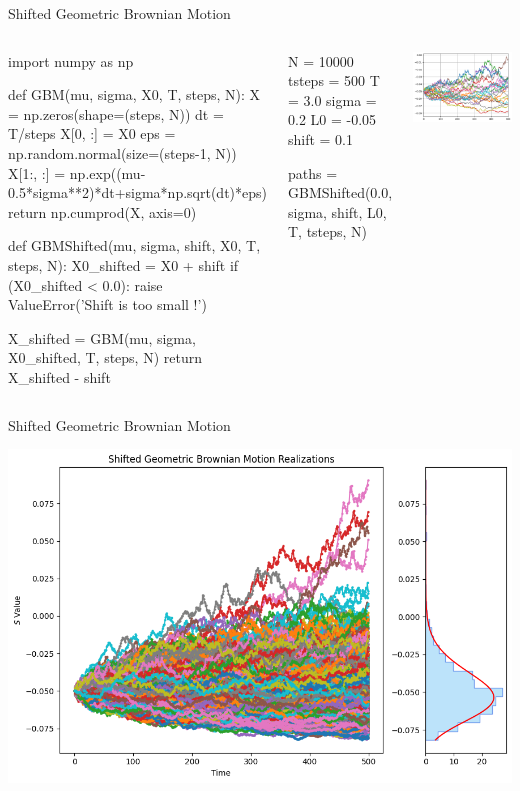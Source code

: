 \documentclass{beamer}
\begin{document}
\begin{frame}[fragile]{Shifted Geometric Brownian Motion}
\begin{columns}
    \begin{ipython}
import numpy as np

def GBM(mu, sigma, X0, T, steps, N):
    X = np.zeros(shape=(steps, N))
    dt = T/steps
    X[0, :] = X0
    eps = np.random.normal(size=(steps-1, N))
    X[1:, :] = np.exp((mu-0.5*sigma**2)*dt+sigma*np.sqrt(dt)*eps)
    return np.cumprod(X, axis=0)

def GBMShifted(mu, sigma, shift, X0, T, steps, N):
    X0_shifted = X0 + shift
    if (X0_shifted < 0.0):
        raise ValueError('Shift is too small !')

    X_shifted = GBM(mu, sigma, X0_shifted, T, steps, N)
    return X_shifted - shift
    \end{ipython}
\begin{ipython}
N = 10000
tsteps = 500
T = 3.0
sigma = 0.2
L0 = -0.05
shift = 0.1

paths = GBMShifted(0.0, sigma, shift, L0, T, tsteps, N)    
\end{ipython}
\begin{center}
\includegraphics[width=0.9\linewidth]{images/shifted_gbm}
\end{center}
\end{columns}
\end{frame}

\begin{frame}{Shifted Geometric Brownian Motion}
	\begin{center}
		\includegraphics[width=0.7\linewidth]{images/shifted_gbm_density}
	\end{center}
\end{frame}
\end{document}
